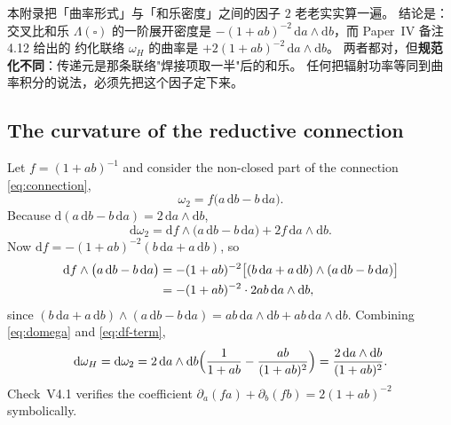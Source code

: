 
\begin{cnread}
本附录把「曲率形式」与「和乐密度」之间的因子 $2$ 老老实实算一遍。
结论是：交叉比和乐 $\Lambda(\square)$ 的一阶展开密度是
$-(1+ab)^{-2}\,\mathrm da\wedge\mathrm db$，而 Paper~IV 备注 4.12 给出的
约化联络 $\omega_H$ 的曲率是 $+2(1+ab)^{-2}\,\mathrm da\wedge\mathrm db$。
两者都对，但\textbf{规范化不同}：传递元是那条联络"焊接项取一半"后的和乐。
任何把辐射功率等同到曲率积分的说法，必须先把这个因子定下来。
\end{cnread}

\subsection{The curvature of the reductive connection}

Let $f=(1+ab)^{-1}$ and consider the non-closed part of the connection
\eqref{eq:connection},
\begin{equation}\label{eq:omega2}
  \omega_2=f\bigl(a\,\mathrm db-b\,\mathrm da\bigr).
\end{equation}
Because $\mathrm d(a\,\mathrm db-b\,\mathrm da)=2\,\mathrm da\wedge\mathrm db$,
\begin{equation}\label{eq:domega}
  \mathrm d\omega_2
  =\mathrm df\wedge\bigl(a\,\mathrm db-b\,\mathrm da\bigr)+2f\,\mathrm da\wedge\mathrm db .
\end{equation}
Now $\mathrm df=-(1+ab)^{-2}(b\,\mathrm da+a\,\mathrm db)$, so
\begin{align}
  \mathrm df\wedge\bigl(a\,\mathrm db-b\,\mathrm da\bigr)
  &=-(1+ab)^{-2}\bigl[(b\,\mathrm da+a\,\mathrm db)\wedge(a\,\mathrm db-b\,\mathrm da)\bigr]
  \notag\\
  &=-(1+ab)^{-2}\cdot 2ab\,\mathrm da\wedge\mathrm db ,
  \label{eq:df-term}
\end{align}
since $(b\,\mathrm da+a\,\mathrm db)\wedge(a\,\mathrm db-b\,\mathrm da)
=ab\,\mathrm da\wedge\mathrm db+ab\,\mathrm da\wedge\mathrm db$.  Combining
\eqref{eq:domega} and \eqref{eq:df-term},
\begin{equation}\label{eq:curvature}
  \mathrm d\omega_H=\mathrm d\omega_2
  =2\,\mathrm da\wedge\mathrm db\Bigl(\frac1{1+ab}-\frac{ab}{(1+ab)^{2}}\Bigr)
  =\frac{2\,\mathrm da\wedge\mathrm db}{(1+ab)^{2}} .
\end{equation}
Check~V4.1 verifies the coefficient
$\partial_a(fa)+\partial_b(fb)=2(1+ab)^{-2}$ symbolically.

